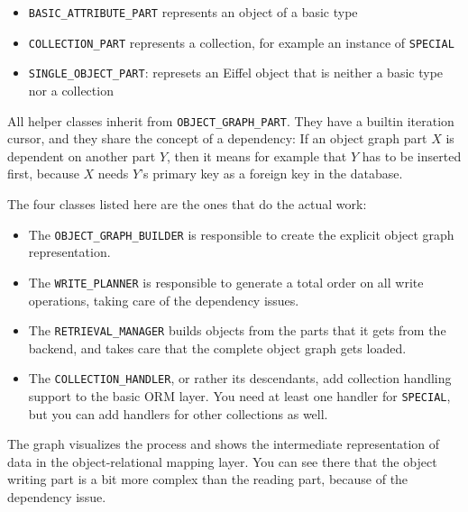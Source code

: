 \begin{itemize}
 \item \lstinline!BASIC_ATTRIBUTE_PART! represents an object of a basic type
 \item \lstinline!COLLECTION_PART! represents a collection, for example an instance of \lstinline!SPECIAL!
 \item \lstinline!SINGLE_OBJECT_PART!: represets an Eiffel object that is neither a basic type nor a collection
\end{itemize}

All helper classes inherit from \lstinline!OBJECT_GRAPH_PART!. 
They have a built\-in iteration cursor, and they share the concept of a dependency:
If an object graph part $X$ is dependent on another part $Y$, then it means for example that $Y$ has to be inserted first, because $X$ needs $Y$'s primary key as a foreign key in the database.

The four classes listed here are the ones that do the actual work:

\begin{itemize}
 \item The \lstinline!OBJECT_GRAPH_BUILDER! is responsible to create the explicit object graph representation.
 \item The \lstinline!WRITE_PLANNER! is responsible to generate a total order on all write operations, taking care of the dependency issues.
 \item The \lstinline!RETRIEVAL_MANAGER! builds objects from the parts that it gets from the backend, and takes care that the complete object graph gets loaded.
 \item The \lstinline!COLLECTION_HANDLER!, or rather its descendants, add collection handling support to the basic ORM layer. 
 You need at least one handler for \lstinline!SPECIAL!, but you can add handlers for other collections as well.
\end{itemize}

The graph visualizes the process and shows the intermediate representation of data in the object-relational mapping layer.
You can see there that the object writing part is a bit more complex than the reading part, because of the dependency issue.


